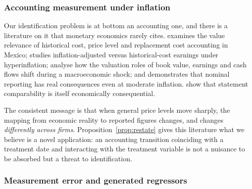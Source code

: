 \documentclass[review,12pt,authoryear]{elsarticle}
\theoremstyle{plain}
\theoremstyle{definition}
\begin{document}
\subsubsection{Accounting measurement under inflation}

Our identification problem is at bottom an accounting one, and there is a
literature on it that monetary economics rarely cites. \citet{gordon2001}
examines the value relevance of historical cost, price level and replacement
cost accounting in Mexico; \citet{barniv1999} studies inflation-adjusted versus
historical-cost earnings under hyperinflation; \citet{davisfriday2005} analyse
how the valuation roles of book value, earnings and cash flows shift during a
macroeconomic shock; and \citet{konchitchki2011} demonstrates that nominal
reporting has real consequences even at moderate inflation.
\citet{defranco2011} show that statement comparability is itself economically
consequential.

The consistent message is that when general price levels move sharply, the
mapping from economic reality to reported figures changes, and changes
\emph{differently across firms}. Proposition~\ref{prop:restate} gives this
literature what we believe is a novel application: an accounting transition
coinciding with a treatment date and interacting with the treatment variable is
not a nuisance to be absorbed but a threat to identification.

\subsubsection{Measurement error and generated regressors}
\end{document}

